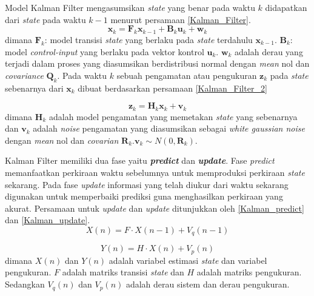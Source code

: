 \documentclass[../thesis.tex]{subfiles}
\begin{document}
Model Kalman Filter mengasumsikan \textit{state} yang benar pada waktu $k$ didapatkan dari \textit{state} pada waktu $k-1$ menurut persamaan \ref{Kalman_Filter}.
\begin{equation} \label{Kalman_Filter}
	\textbf{x}_k = \textbf{F}_{k}\textbf{x}_{k-1} + \textbf{B}_{k}\textbf{u}_k + \textbf{w}_k
\end{equation}
dimana $\textbf{F}_{k}$: model transisi \textit{state} yang berlaku pada \textit{state} terdahulu $\textbf{x}_{k-1}$. $\textbf{B}_{k}$: model \textit{control-input} yang berlaku pada vektor kontrol $\textbf{u}_k$.
$\textbf{w}_k$ adalah derau yang terjadi dalam proses yang diasumsikan berdistribusi normal dengan \textit{mean} nol dan \textit{covariance} $\textbf{Q}_k$. 
Pada waktu $k$ sebuah pengamatan atau pengukuran $\textbf{z}_k$ pada \textit{state} sebenarnya dari $\textbf{x}_k$ dibuat berdasarkan persamaan \ref{Kalman_Filter_2}

\begin{equation} \label{Kalman_Filter_2}
	\textbf{z}_k = \textbf{H}_{k}\textbf{x}_{k} + \textbf{v}_k
\end{equation}
dimana $\textbf{H}_k$ adalah model pengamatan yang memetakan \textit{state} yang sebenarnya dan $\textbf{v}_k$ adalah \textit{noise} pengamatan yang diasumsikan sebagai \textit{white gaussian noise} dengan \textit{mean} nol dan \textit{covarian} $\textbf{R}_k$.$\textbf{v}_k \sim N(0, \textbf{R}_k)$. 

Kalman Filter memiliki dua fase yaitu \textbf{\textit{predict}} dan \textbf{\textit{update}}. Fase \textit{predict} memanfaatkan perkiraan waktu sebelumnya untuk memproduksi perkiraan \textit{state} sekarang.
Pada fase \textit{update} informasi yang telah diukur dari waktu sekarang digunakan untuk memperbaiki prediksi guna menghasilkan perkiraan yang akurat. Persamaan untuk \textit{update} dan \textit{update} ditunjukkan oleh \ref{Kalman_predict} dan \ref{Kalman_update}.
\begin{equation} \label{Kalman_predict}
	X(n) = F \cdot X(n-1) + V_{q}(n-1)	
\end{equation}

\begin{equation} \label{Kalman_update}
	Y(n) = H \cdot X(n) + V_{p}(n)
\end{equation}
dimana $X(n)$ dan $Y(n)$ adalah variabel estimasi \textit{state} dan variabel pengukuran. $F$ adalah matriks transisi \textit{state} dan $H$ adalah matriks pengukuran. Sedangkan $V_{q}(n)$ dan $V_{p}(n)$ adalah derau sistem dan derau pengukuran.
\end{document}
